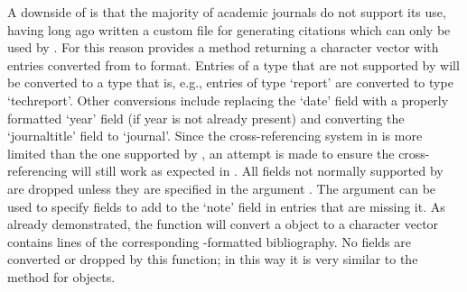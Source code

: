\documentclass[article]{jss}\usepackage[]{graphicx}\usepackage[]{color}
\newcommand{\ourpkg}{\pkg{RefManageR}}
\begin{document}
A downside of \Biblatex{} is that the majority of academic journals do not support its use, having long ago written a custom  file for generating citations which can only be used by \Bibtex{}.  For this reason \ourpkg{} provides a  method returning a character vector with entries converted from \Biblatex{} to \Bibtex{} format.  Entries of a type that are not supported by \Bibtex{} will be converted to a type that is, e.g., entries of type `report' are converted to type `techreport'.  Other conversions include replacing the `date' field with a properly formatted `year' field (if year is not already present) and converting the `journaltitle' field to `journal'.  Since the cross-referencing system in \Bibtex{} is more limited than the one supported by \Biblatex{}, an attempt is made to ensure the cross-referencing will still work as expected in \Bibtex{}.  All fields not normally supported by \Bibtex{} are dropped unless they are specified in the argument .  The argument  can be used to specify fields to add to the `note' field in entries that are missing it.  As already demonstrated, the  function will convert a  object to a character vector contains lines of the corresponding \Biblatex-formatted bibliography.  No fields are converted or dropped by this function; in this way it is very similar to the  method for  objects.
\end{document}
